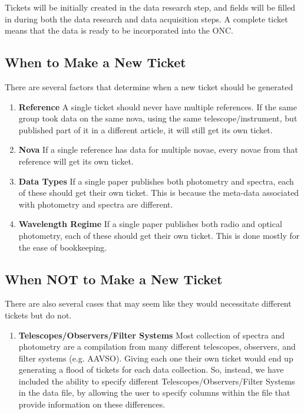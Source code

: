 \documentclass{article}
\begin{document}
Tickets will be initially created in the data research step, and fields will be filled in during both the data research and data acquisition steps. A complete ticket means that the data is ready to be incorporated into the ONC.

\subsection{When to Make a New Ticket}
There are several factors that determine when a new ticket should be generated
\begin{enumerate}
\item \textbf{Reference} A single ticket should never have multiple references. If the same group took data on the same nova, using the same telescope/instrument, but published part of it in a different article, it will still get its own ticket.
\item \textbf{Nova} If a single reference has data for multiple novae, every novae from that reference will get its own ticket. 
\item \textbf{Data Types} If a single paper publishes both photometry and spectra, each of these should get their own ticket. This is because the meta-data associated with photometry and spectra are different. 
\item \textbf{Wavelength Regime} If a single paper publishes both radio and optical photometry, each of these should get their own ticket. This is done mostly for the ease of bookkeeping.
\end{enumerate}


\subsection{When NOT to Make a New Ticket}
There are also several cases that may seem like they would necessitate different tickets but do not.
\begin{enumerate}
\item \textbf{Telescopes/Observers/Filter Systems} Most collection of spectra and photometry are a compilation from many different telescopes, observers, and filter systems (e.g. AAVSO). Giving each one their own ticket would end up generating a flood of tickets for each data collection. So, instead, we have included the ability to specify different Telescopes/Observers/Filter Systems in the data file, by allowing the user to specify columns within the file that provide information on these differences.
\end{enumerate}
\end{document}
